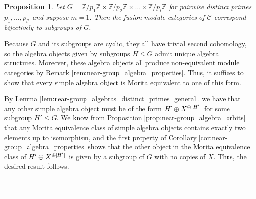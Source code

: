 \documentclass[12pt, reqno]{amsart}
\makeatletter
\def\section{\@startsection{section}{1}\z@{0pt}{0.5\linespacing}{\LARGE\scshape}}
\numberwithin{equation}{section}
\theoremstyle{plainspace}
\newtheorem{proposition}[theorem]{Proposition}
\theoremstyle{definitionspace}
\theoremstyle{remarkspace}
\renewenvironment{proof}{{\noindent\textbf{Proof.}}}{\null\hfill\qedsymbol}
\newcommand{\sectionbar}[4]{
	\noindent\\[#3\linespacing] \rule{#1\linewidth}{#2} \\[#4\linespacing]
}
\DeclarePairedDelimiter{\abs}{\lvert}{\rvert}
\newcommand{\mathcat}[1]{\mathcal{#1}}
\makeatother
\begin{document}
\begin{proposition}\label{prop:near-group_algebras_distinct_primes_special}
Let $G = \mathbb{Z}/p_1\mathbb{Z} \times \mathbb{Z}/p_2\mathbb{Z} \times \dots \times \mathbb{Z}/p_l\mathbb{Z}$ for pairwise distinct primes $p_1, \dots, p_l$, and suppose $m = 1$. Then the fusion module categories of $\mathcat{C}$ correspond bijectively to subgroups of $G$.
\end{proposition}
\leavevmode\newline
\begin{proof}
\noindent Because $G$ and its subgroups are cyclic, they all have trivial second cohomology, so the algebra objects given by subgroups $H \leq G$ admit unique algebra structures. Moreover, these algebra objects all produce non-equivalent module categories by \hyperref[rem:near-group_algebra_properties]{Remark \ref*{rem:near-group_algebra_properties}}. Thus, it suffices to show that every simple algebra object is Morita equivalent to one of this form.
\newline

\noindent By \hyperref[lem:near-group_algebras_distinct_primes_general]{Lemma \ref*{lem:near-group_algebras_distinct_primes_general}}, we have that any other simple algebra object must be of the form $H' \oplus X^{\oplus \abs{H'}}$ for some subgroup $H' \leq G$. We know from \hyperref[prop:near-group_algebra_orbits]{Proposition \ref*{prop:near-group_algebra_orbits}} that any Morita equivalence class of simple algebra objects contains exactly two elements up to isomorphism, and the first property of \hyperref[cor:near-group_algebra_properties]{Corollary \ref*{cor:near-group_algebra_properties}} shows that the other object in the Morita equivalence class of $H' \oplus X^{\oplus \abs{H'}}$ is given by a subgroup of $G$ with no copies of $X$. Thus, the desired result follows.
\end{proof}
\newpage


\section{References}
\sectionbar{1}{1pt}{-2}{0}

\printbibliography[heading = none]
\end{document}
